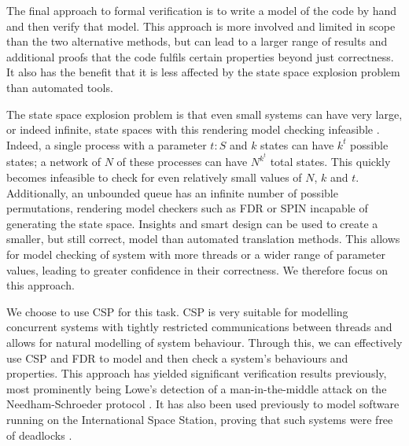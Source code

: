 The final approach to formal verification is to write a model of the code by hand and then verify that model. This approach is more involved and limited in scope than the two alternative methods, but can lead to a larger range of results and additional proofs that the code fulfils certain properties beyond just correctness. It also has the benefit that it is less affected by the state space explosion problem than automated tools. 

The state space explosion problem is that even small systems can have very large, or indeed infinite, state spaces with this rendering model checking infeasible \cite{StateSpace}. 
Indeed, a single process with a parameter $t : S$ and $k$ states can have $k^{t}$ possible states; a network of $N$ of these processes can have $N^{k^{t}}$ total states. This quickly becomes infeasible to check for even relatively small values of $N$, $k$ and $t$. Additionally, an unbounded queue has an infinite number of possible permutations, rendering model checkers such as FDR or SPIN \cite{SPIN} incapable of generating the state space. Insights and smart design can be used to create a smaller, but still correct, model than automated translation methods. This allows for model checking of system with more threads or a wider range of parameter values, leading to greater confidence in their correctness. We therefore focus on this approach.




We choose to use CSP for this task. CSP is very suitable for modelling concurrent systems with tightly restricted communications between threads \cite{Lawrence2005} and allows for natural modelling of system behaviour. Through this, we can effectively use CSP and FDR to model and then check a system's behaviours and properties. This approach has yielded significant verification results previously, most prominently being Lowe's detection of a man-in-the-middle attack on the Needham-Schroeder protocol \cite{LoweNeedham}. It has also been used previously to model software running on the International Space Station, proving that such systems were free of deadlocks \cite{DeadlockAnalysis}. 

